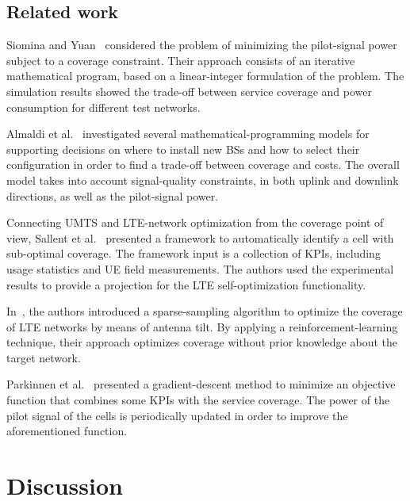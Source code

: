 \subsection*{Related work}

Siomina and Yuan~\cite{Siomina:Minimum.pilot.power.for.service.coverage}
considered the problem of minimizing the pilot-signal power subject
to a coverage constraint. Their approach consists of an iterative
mathematical program, based on a linear-integer formulation of the
problem. The simulation results showed the trade-off between service
coverage and power consumption for different test networks.

Almaldi et al.~\cite{Amaldi-Radio_planning_and_coverage_optimization_of_3G_networks:2008}
investigated several mathematical-programming models for supporting
decisions on where to install new BSs and how to select their configuration
in order to find a trade-off between coverage and costs. The overall
model takes into account signal-quality constraints, in both uplink
and downlink directions, as well as the pilot-signal power.

Connecting UMTS and LTE-network optimization from the coverage point
of view, Sallent et al.~\cite{Sallent-A_roadmap_from_UMTS_to_LTE_optimization:2011}
presented a framework to automatically identify a cell with sub-optimal
coverage. The framework input is a collection of KPIs, including usage
statistics and UE field measurements. The authors used the experimental
results to provide a projection for the LTE self-optimization functionality.

In~\cite{Thampi-A_sparse_sampling_algorithm_for_self_optimization_of_coverage_in_LTE:2012},
the authors introduced a sparse-sampling algorithm to optimize the
coverage of LTE networks by means of antenna tilt. By applying a reinforcement-learning
technique, their approach optimizes coverage without prior knowledge
about the target network.

Parkinnen et al.~\cite{Coverage.optimization.with.cost.function:2002}
presented a gradient-descent method to minimize an objective function
that combines some KPIs with the service coverage. The power of the
pilot signal of the cells is periodically updated in order to improve
the aforementioned function.


\section{Discussion}

